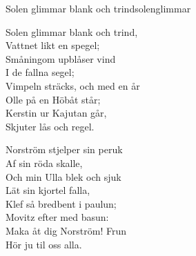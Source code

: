 \begin{song}{Solen glimmar blank och trind}{solenglimmar}

\begin{vers}
Solen glimmar blank och trind,\\
Vattnet likt en spegel;\\
Småningom upblåser vind\\
I de fallna segel;\\
Vimpeln sträcks, och med en år\\
Olle på en Höbåt står;\\
Kerstin ur Kajutan går,\\
Skjuter lås och regel.\\
\end{vers}
\begin{vers}
Norström stjelper sin peruk\\
Af sin röda skalle,\\
Och min Ulla blek och sjuk\\
Lät sin kjortel falla,\\
Klef så bredbent i paulun;\\
Movitz efter med basun:\\
Maka åt dig Norström! Frun\\
Hör ju til oss alla.\\
\end{vers}
\end{song}


